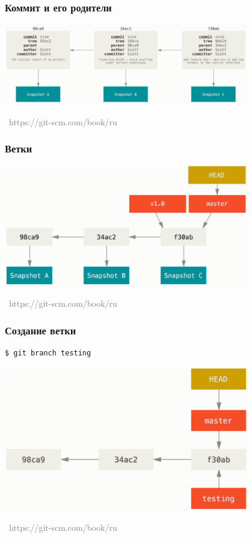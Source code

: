 \documentclass[xetex,mathserif,serif]{beamer}
\newcommand{\attribution}[1] {
    \vspace{-5mm}\begin{flushright}\begin{scriptsize}\textcolor{gray}{\textcopyright\, #1}\end{scriptsize}\end{flushright}
}
\begin{document}
    \begin{frame}
        \frametitle{Коммит и его родители}
        \begin{center}
            \includegraphics[width=0.8\textwidth]{commits.png}
            \attribution{https://git-scm.com/book/ru}
        \end{center}
    \end{frame}

    \begin{frame}
        \frametitle{Ветки}
        \begin{center}
            \includegraphics[width=0.8\textwidth]{branches.png}
            \attribution{https://git-scm.com/book/ru}
        \end{center}
    \end{frame}

    \begin{frame}[fragile]
        \frametitle{Создание ветки}
        \begin{verbatim}
$ git branch testing
        \end{verbatim}
        \begin{center}
            \includegraphics[width=0.8\textwidth]{creatingBranch.png}
            \attribution{https://git-scm.com/book/ru}
        \end{center}
    \end{frame}
\end{document}
